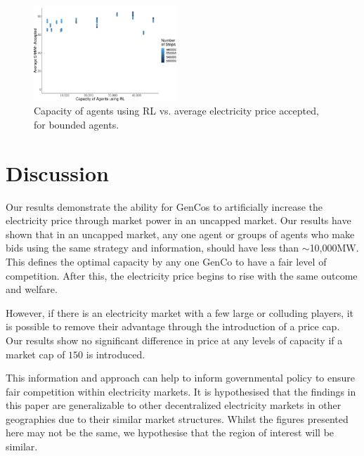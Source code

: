 \begin{figure}
	\includegraphics[width=0.48\textwidth]{figures/results/bounded_results_scatter.pdf}
	\caption{Capacity of agents using RL vs. average electricity price accepted, for bounded agents.}
	\label{fig:bounded_results_scatter}
\end{figure}






\section{Discussion}
\label{sec:discussion}

Our results demonstrate the ability for GenCos to artificially increase the electricity price through market power in an uncapped market. Our results have shown that in an uncapped market, any one agent or groups of agents who make bids using the same strategy and information, should have less than ${\sim}$10,000MW. This defines the optimal capacity by any one GenCo to have a fair level of competition. After this, the electricity price begins to rise with the same outcome and welfare.

However, if there is an electricity market with a few large or colluding players, it is possible to remove their advantage through the introduction of a price cap. Our results show no significant difference in price at any levels of capacity if a market cap of \textsterling$150$ is introduced.

This information and approach can help to inform governmental policy to ensure fair competition within electricity markets. It is hypothesised that the findings in this paper are generalizable to other decentralized electricity markets in other geographies due to their similar market structures. Whilst the figures presented here may not be the same, we hypothesise that the region of interest will be similar.


